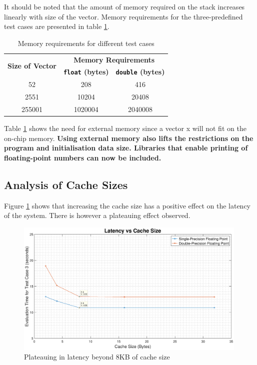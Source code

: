 \documentclass{article}
\begin{document}
It should be noted that the amount of memory required on the stack increases linearly with size of the vector. Memory requirements for the three-predefined test cases are presented in table \ref{tab:vector_memory}.

\begin{table}[H]
  \centering
    \begin{tabular}{|c|c|c|}
    \hline
    \multirow{2}[4]{*}{\textbf{Size of Vector }} & \multicolumn{2}{c|}{\textbf{Memory Requirements}} \\
\cline{2-3}          & \textbf{{\tt float} (bytes)} & \textbf{{\tt double} (bytes)} \\
    \hline
    52    & 208   & 416 \\
    \hline
    2551  & 10204 & 20408 \\
    \hline
    255001 & 1020004 & 2040008 \\
    \hline
    \end{tabular}%
    \caption{Memory requirements for different test cases}
  \label{tab:vector_memory}%
\end{table}%

Table \ref{tab:vector_memory} shows the need for external memory since a vector x will not fit on the on-chip memory. \textbf{Using external memory also lifts the restrictions on the program and initialisation data size. Libraries that enable printing of floating-point numbers can now be included.}\\ 

\newpage
\subsection{Analysis of Cache Sizes}

Figure \ref{fig:latency_cache_size} shows that increasing the cache size has a positive effect on the latency of the system. There is however a plateauing effect observed.

\begin{figure}[H]
    \centering
    \includegraphics[width=0.99\textwidth]{graph2.eps}
    \caption{Plateauing in latency beyond 8KB of cache size}
    \label{fig:latency_cache_size}
\end{figure}
\end{document}
